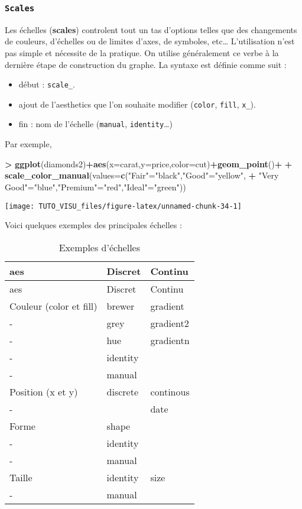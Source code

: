 \documentclass[]{article}
\newenvironment{Shaded}{\begin{snugshade}}{\end{snugshade}}
\newcommand{\DataTypeTok}[1]{\textcolor[rgb]{0.13,0.29,0.53}{#1}}
\newcommand{\KeywordTok}[1]{\textcolor[rgb]{0.13,0.29,0.53}{\textbf{#1}}}
\newcommand{\NormalTok}[1]{#1}
\newcommand{\OperatorTok}[1]{\textcolor[rgb]{0.81,0.36,0.00}{\textbf{#1}}}
\newcommand{\StringTok}[1]{\textcolor[rgb]{0.31,0.60,0.02}{#1}}
\providecommand{\tightlist}{%
  \setlength{\itemsep}{0pt}\setlength{\parskip}{0pt}}
\theoremstyle{definition}
\theoremstyle{definition}
\theoremstyle{definition}
\theoremstyle{remark}
\begin{document}
\hypertarget{scales}{%
\subsubsection{\texorpdfstring{\texttt{Scales}}{Scales}}\label{scales}}

Les échelles (\textbf{scales}) controlent tout un tas d'options telles que des changements de couleurs, d'échelles ou de limites d'axes, de symboles, etc\ldots{} L'utilisation n'est pas simple et nécessite de la pratique. On utilise généralement ce verbe à la dernière étape de construction du graphe. La syntaxe est définie comme suit :

\begin{itemize}
\tightlist
\item
  début : \texttt{scale\_}.
\item
  ajout de l'aesthetics que l'on souhaite modifier (\texttt{color}, \texttt{fill}, \texttt{x\_}).
\item
  fin : nom de l'échelle (\texttt{manual}, \texttt{identity}\ldots{})
\end{itemize}

Par exemple,

\begin{Shaded}
\begin{Highlighting}[]
\OperatorTok{>}\StringTok{ }\KeywordTok{ggplot}\NormalTok{(diamonds2)}\OperatorTok{+}\KeywordTok{aes}\NormalTok{(}\DataTypeTok{x=}\NormalTok{carat,}\DataTypeTok{y=}\NormalTok{price,}\DataTypeTok{color=}\NormalTok{cut)}\OperatorTok{+}\KeywordTok{geom_point}\NormalTok{()}\OperatorTok{+}
\OperatorTok{+}\StringTok{   }\KeywordTok{scale_color_manual}\NormalTok{(}\DataTypeTok{values=}\KeywordTok{c}\NormalTok{(}\StringTok{"Fair"}\NormalTok{=}\StringTok{"black"}\NormalTok{,}\StringTok{"Good"}\NormalTok{=}\StringTok{"yellow"}\NormalTok{,}
\OperatorTok{+}\StringTok{                               "Very Good"}\NormalTok{=}\StringTok{"blue"}\NormalTok{,}\StringTok{"Premium"}\NormalTok{=}\StringTok{"red"}\NormalTok{,}\StringTok{"Ideal"}\NormalTok{=}\StringTok{"green"}\NormalTok{))}
\end{Highlighting}
\end{Shaded}

\begin{center}\texttt{[image: TUTO\_VISU\_files/figure-latex/unnamed-chunk-34-1]} \end{center}

Voici quelques exemples des principales échelles :

\begin{longtable}[]{@{}lll@{}}
\caption{\label{tab:scales} Exemples d'échelles}\tabularnewline
\toprule
aes & Discret & Continu\tabularnewline
\midrule
\endfirsthead
\toprule
aes & Discret & Continu\tabularnewline
\midrule
\endhead
Couleur (color et fill) & brewer & gradient\tabularnewline
- & grey & gradient2\tabularnewline
- & hue & gradientn\tabularnewline
- & identity &\tabularnewline
- & manual &\tabularnewline
Position (x et y) & discrete & continous\tabularnewline
- & & date\tabularnewline
Forme & shape &\tabularnewline
- & identity &\tabularnewline
- & manual &\tabularnewline
Taille & identity & size\tabularnewline
- & manual &\tabularnewline
\bottomrule
\end{longtable}
\end{document}
